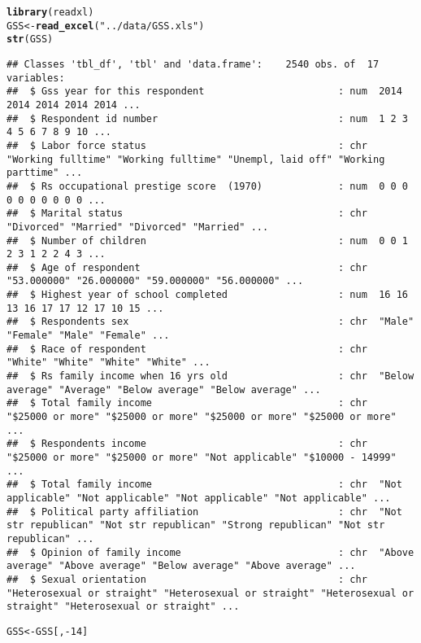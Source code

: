 \documentclass[fleqn,10pt,lineno]{wlpeerj}\usepackage[]{graphicx}\usepackage[]{color}
\makeatletter
\newcommand{\hlnum}[1]{\textcolor[rgb]{0.686,0.059,0.569}{#1}}%
\newcommand{\hlstr}[1]{\textcolor[rgb]{0.192,0.494,0.8}{#1}}%
\newcommand{\hlopt}[1]{\textcolor[rgb]{0,0,0}{#1}}%
\newcommand{\hlstd}[1]{\textcolor[rgb]{0.345,0.345,0.345}{#1}}%
\newcommand{\hlkwb}[1]{\textcolor[rgb]{0.69,0.353,0.396}{#1}}%
\newcommand{\hlkwd}[1]{\textcolor[rgb]{0.737,0.353,0.396}{\textbf{#1}}}%
\newenvironment{kframe}{%
 \def\at@end@of@kframe{}%
 \ifinner\ifhmode%
  \def\at@end@of@kframe{\end{minipage}}%
  \begin{minipage}{\columnwidth}%
 \fi\fi%
 \def\FrameCommand##1{\hskip\@totalleftmargin \hskip-\fboxsep
 \colorbox{shadecolor}{##1}\hskip-\fboxsep
     \hskip-\linewidth \hskip-\@totalleftmargin \hskip\columnwidth}%
 \MakeFramed {\advance\hsize-\width
   \@totalleftmargin\z@ \linewidth\hsize
   \@setminipage}}%
 {\par\unskip\endMakeFramed%
 \at@end@of@kframe}
\newenvironment{knitrout}{}{} %
\makeatother
\begin{document}
\begin{knitrout}\footnotesize
{}\color{fgcolor}\begin{kframe}
\begin{alltt}
\hlkwd{library}\hlstd{(readxl)}
\hlstd{GSS} \hlkwb{<-} \hlkwd{read_excel}\hlstd{(}\hlstr{"../data/GSS.xls"}\hlstd{)}
\hlkwd{str}\hlstd{(GSS)}
\end{alltt}
\begin{verbatim}
## Classes 'tbl_df', 'tbl' and 'data.frame':	2540 obs. of  17 variables:
##  $ Gss year for this respondent                       : num  2014 2014 2014 2014 2014 ...
##  $ Respondent id number                               : num  1 2 3 4 5 6 7 8 9 10 ...
##  $ Labor force status                                 : chr  "Working fulltime" "Working fulltime" "Unempl, laid off" "Working parttime" ...
##  $ Rs occupational prestige score  (1970)             : num  0 0 0 0 0 0 0 0 0 0 ...
##  $ Marital status                                     : chr  "Divorced" "Married" "Divorced" "Married" ...
##  $ Number of children                                 : num  0 0 1 2 3 1 2 2 4 3 ...
##  $ Age of respondent                                  : chr  "53.000000" "26.000000" "59.000000" "56.000000" ...
##  $ Highest year of school completed                   : num  16 16 13 16 17 17 12 17 10 15 ...
##  $ Respondents sex                                    : chr  "Male" "Female" "Male" "Female" ...
##  $ Race of respondent                                 : chr  "White" "White" "White" "White" ...
##  $ Rs family income when 16 yrs old                   : chr  "Below average" "Average" "Below average" "Below average" ...
##  $ Total family income                                : chr  "$25000 or more" "$25000 or more" "$25000 or more" "$25000 or more" ...
##  $ Respondents income                                 : chr  "$25000 or more" "$25000 or more" "Not applicable" "$10000 - 14999" ...
##  $ Total family income                                : chr  "Not applicable" "Not applicable" "Not applicable" "Not applicable" ...
##  $ Political party affiliation                        : chr  "Not str republican" "Not str republican" "Strong republican" "Not str republican" ...
##  $ Opinion of family income                           : chr  "Above average" "Above average" "Below average" "Above average" ...
##  $ Sexual orientation                                 : chr  "Heterosexual or straight" "Heterosexual or straight" "Heterosexual or straight" "Heterosexual or straight" ...
\end{verbatim}
\begin{alltt}
\hlstd{GSS} \hlkwb{<-} \hlstd{GSS[,}\hlopt{-}\hlnum{14}\hlstd{]}
\end{alltt}
\end{kframe}
\end{knitrout}
\end{document}
